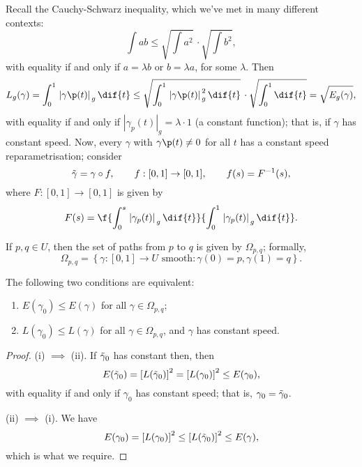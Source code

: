 Recall the Cauchy-Schwarz inequality, which we've met in many different contexts:
\begin{equation*}
	\textstyle \int ab \leq \sqrt{\int a^2} \, \cdot \sqrt{\int b^2},
\end{equation*}
with equality if and only if $a=\lambda b$ or $b=\lambda a$, for some $\lambda$. Then
\begin{equation*}
	L_g(\gamma)
	= \int_0^1 \left.|\gamma\p(t)|\right._g \dif{t}
	\leq \sqrt{\int_0^1 \left.|\gamma\p(t)|\right._g^2 \dif{t}} \, \cdot \sqrt{\int_0^1 \dif{t}}
	= \sqrt{E_g(\gamma)},
\end{equation*}
with equality if and only if $\left.|\gamma_p(t)|\right._g = \lambda \cdot 1$ (a constant function); that is, if $\gamma$ has constant speed. Now, every $\gamma$ with $\gamma\p(t) \neq 0$ for all $t$ has a constant speed reparametrisation; consider
\begin{equation*}
	\tilde{\gamma} = \gamma \circ f, \qquad
	f:[0,1] \to [0,1], \qquad
	f(s) = F^{-1}(s),
\end{equation*}
where $F:[0,1] \to [0,1]$ is given by 
\begin{equation*}
	F(s) = \f{\int_0^s \left.|\gamma_p(t)|\right._g \dif{t}}{\int_0^1 \left.|\gamma_p(t)|\right._g \dif{t}}.
\end{equation*}

\begin{definition}
	If $p,q \in U$, then the set of paths from $p$ to $q$ is given by $\Omega_{p,q}$; formally,
	\begin{equation*}
		\Omega_{p,q} = \left\{\text{$\gamma:[0,1]\to U$ smooth}: \gamma(0)=p, \gamma(1)=q\right\}.
	\end{equation*}
\end{definition}

\begin{proposition}
	The following two conditions are equivalent:
	\begin{enumerate}
	    \shortskip
		\item $E(\gamma_0) \leq E(\gamma)$ for all $\gamma\in\Omega_{p,q}$;
		\item $L(\gamma_0) \leq L(\gamma)$ for all $\gamma\in \Omega_{p,q}$, and $\gamma$ has constant speed.
	\end{enumerate}
\end{proposition}

\begin{proof}
	(i) $\implies$ (ii). If $\tilde{\gamma}_0$ has constant then, then
	\begin{equation*}
		E(\tilde{\gamma}_0)
		= \left[ L(\tilde{\gamma}_0) \right]^2
		= \left[ L(\gamma_0) \right]^2
		\leq E(\gamma_0),
	\end{equation*}
	with equality if and only if $\gamma_0$ has constant speed; that is, $\gamma_0 = \tilde{\gamma}_0$.

	(ii) $\implies$ (i). We have
	\begin{equation*}
		E(\gamma_0)
		= \left[ L(\gamma_0) \right]^2
		\leq \left[ L(\tilde{\gamma}_0) \right]^2
		\leq E(\gamma),
	\end{equation*}
	which is what we require.
\end{proof}

